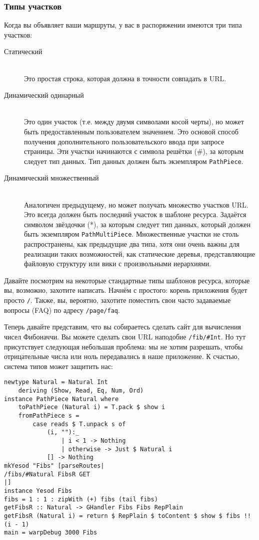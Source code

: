 \subsubsection{Типы участков}
Когда вы объявляет ваши маршруты, у вас в распоряжении имеются три
типа участков:
\begin{description}
\item[Статический] \hfill \\
Это простая строка, которая должна в точности совпадать в URL.

\item[Динамический одинарный] \hfill \\
Это один участок (т.е. между двумя символами косой черты), но может
быть предоставленным пользователем значением. Это основой способ
получения дополнительного пользовательского ввода при запросе
страницы. Эти участки начинаются с символа решётки (\#), за которым
следует тип данных. Тип данных должен быть экземпляром
\lstinline!PathPiece!.

\item [Динамический множественный] \hfill \\
Аналогичен предыдущему, но может получать множество участков URL. Это
всегда должен быть последний участок в шаблоне ресурса. Задаётся
символом звёздочки (*), за которым следует тип данных, который должен
быть экземпляром \lstinline!PathMultiPiece!. Множественные участки не
столь распространены, как предыдущие два типа, хотя они очень важны
для реализации таких возможностей, как статические деревья,
представляющие файловую структуру или вики с произвольными иерархиями.
\end{description}

Давайте посмотрим на некоторые стандартные типы шаблонов ресурса,
которые вы, возможно, захотите написать. Начнём с простого: корень
приложения будет просто \lstinline!/!. Также, вы, вероятно, захотите
поместить свои часто задаваемые вопросы (FAQ) по адресу
\lstinline!/page/faq!.

Теперь давайте представим, что вы собираетесь сделать сайт для
вычисления чисел Фибоначчи. Вы можете сделать свои URL наподобие
\lstinline!/fib/#Int!. Но тут присутствует следующая небольшая проблема: мы не
хотим разрешать, чтобы отрицательные числа или ноль передавались в
наше приложение. К счастью, система типов может защитить нас:
\begin{lstlisting}
newtype Natural = Natural Int
    deriving (Show, Read, Eq, Num, Ord)
instance PathPiece Natural where
    toPathPiece (Natural i) = T.pack $ show i
    fromPathPiece s =
        case reads $ T.unpack s of
            (i, ""):_
                | i < 1 -> Nothing
                | otherwise -> Just $ Natural i
            [] -> Nothing
mkYesod "Fibs" [parseRoutes|
/fibs/#Natural FibsR GET
|]
instance Yesod Fibs
fibs = 1 : 1 : zipWith (+) fibs (tail fibs)
getFibsR :: Natural -> GHandler Fibs Fibs RepPlain
getFibsR (Natural i) = return $ RepPlain $ toContent $ show $ fibs !! (i - 1)
main = warpDebug 3000 Fibs
\end{lstlisting}%

